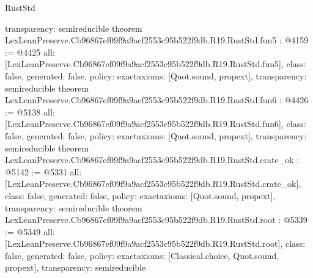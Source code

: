 \begin{lexlean}{RustStd}
\begin{coremodule}
{  transparency: semireducible
}
theorem LexLeanPreserve.Cb96867ef09f9a9acf2553c95b522f9db.R19.RustStd.fun5 : @4159 := @4425 {
  all: [LexLeanPreserve.Cb96867ef09f9a9acf2553c95b522f9db.R19.RustStd.fun5],
  class: false,
  generated: false,
  policy: exact{axioms: [Quot.sound, propext]},
  transparency: semireducible
}
theorem LexLeanPreserve.Cb96867ef09f9a9acf2553c95b522f9db.R19.RustStd.fun6 : @4426 := @5138 {
  all: [LexLeanPreserve.Cb96867ef09f9a9acf2553c95b522f9db.R19.RustStd.fun6],
  class: false,
  generated: false,
  policy: exact{axioms: [Quot.sound, propext]},
  transparency: semireducible
}
theorem LexLeanPreserve.Cb96867ef09f9a9acf2553c95b522f9db.R19.RustStd.crate_ok : @5142 := @5331 {
  all: [LexLeanPreserve.Cb96867ef09f9a9acf2553c95b522f9db.R19.RustStd.crate_ok],
  class: false,
  generated: false,
  policy: exact{axioms: [Quot.sound, propext]},
  transparency: semireducible
}
theorem LexLeanPreserve.Cb96867ef09f9a9acf2553c95b522f9db.R19.RustStd.root : @5339 := @5349 {
  all: [LexLeanPreserve.Cb96867ef09f9a9acf2553c95b522f9db.R19.RustStd.root],
  class: false,
  generated: false,
  policy: exact{axioms: [Classical.choice, Quot.sound, propext]},
  transparency: semireducible
}


\end{coremodule}
\end{lexlean}
